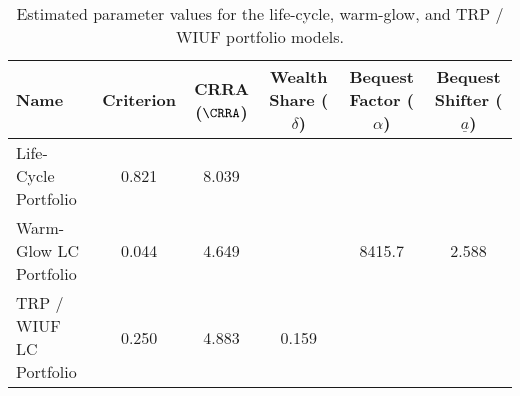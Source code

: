 \begin{table}\centering
    \begin{tabular}{lccccc}
        \toprule
        Name                   & Criterion & CRRA ($\CRRA$) & Wealth Share ($\delta$) & Bequest Factor ($\alpha$) & Bequest Shifter ($\underline{a}$) \\
        \midrule
        Life-Cycle Portfolio   & 0.821     & 8.039          &                         &                           &                                 \\
        Warm-Glow LC Portfolio & 0.044     & 4.649          &                         & 8415.7                    & 2.588                          \\
        TRP / WIUF LC Portfolio       & 0.250     & 4.883          & 0.159                   &                           &                                 \\
        \bottomrule
    \end{tabular}
    \caption{Estimated parameter values for the life-cycle, warm-glow, and TRP / WIUF portfolio models.}
    \label{parameters}
\end{table}